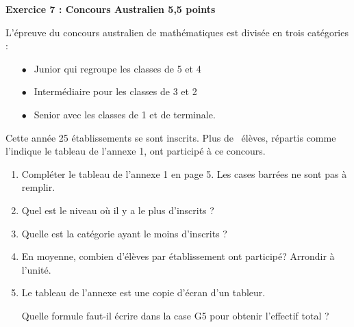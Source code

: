 \textbf{Exercice 7 : Concours Australien \hfill 5,5 points}

\bigskip
 
L'épreuve du concours australien de mathématiques est divisée en trois catégories :

\setlength\parindent{8mm} 
\begin{itemize}
\item[$\bullet~~$] \og Junior \fg{} qui regroupe les classes de 5 et 4 
\item[$\bullet~~$] \og Intermédiaire \fg{} pour les classes de 3 et 2 
\item[$\bullet~~$] \og Senior \fg{} avec les classes de 1 et de terminale.
\end{itemize}
\setlength\parindent{0mm} 
 
Cette année 25 établissements se sont inscrits. Plus de ~élèves, répartis comme l'indique le tableau de l'annexe 1, ont participé à ce concours.

\medskip
 
\begin{enumerate}
\item Compléter le tableau de l'annexe 1 en page 5. Les cases barrées ne sont pas à remplir. 
\item Quel est le niveau où il y a le plus d'inscrits ? 
\item Quelle est la catégorie ayant le moins d'inscrits ? 
\item En moyenne, combien d'élèves par établissement ont participé? Arrondir à l'unité. 
\item Le tableau de l'annexe est une copie d'écran d'un tableur. 

Quelle formule faut-il écrire dans la case G5 pour obtenir l'effectif total ?
\end{enumerate}

\bigskip 

